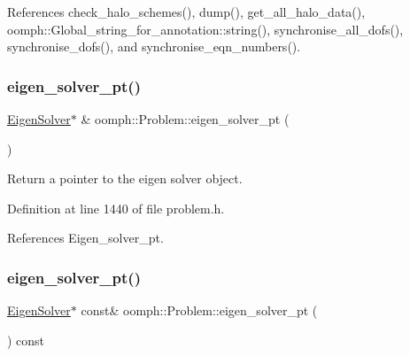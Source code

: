 References check\+\_\+halo\+\_\+schemes(), dump(), get\+\_\+all\+\_\+halo\+\_\+data(), oomph\+::\+Global\+\_\+string\+\_\+for\+\_\+annotation\+::string(), synchronise\+\_\+all\+\_\+dofs(), synchronise\+\_\+dofs(), and synchronise\+\_\+eqn\+\_\+numbers().

\mbox{\label{classoomph_1_1Problem_abd8a7002c37f3a96d0af213bfea8e23c}} 
\subsubsection{\texorpdfstring{eigen\+\_\+solver\+\_\+pt()}{eigen\_solver\_pt()}\hspace{0.1cm}{\footnotesize\ttfamily [1/2]}}
{\footnotesize\ttfamily \hyperlink{classoomph_1_1EigenSolver}{Eigen\+Solver}$\ast$ \& oomph\+::\+Problem\+::eigen\+\_\+solver\+\_\+pt (\begin{DoxyParamCaption}{ }\end{DoxyParamCaption})\hspace{0.3cm}{\ttfamily [inline]}}



Return a pointer to the eigen solver object. 



Definition at line 1440 of file problem.\+h.



References Eigen\+\_\+solver\+\_\+pt.

\mbox{\label{classoomph_1_1Problem_a14d44adcbf581d43154be19d127b6183}} 
\subsubsection{\texorpdfstring{eigen\+\_\+solver\+\_\+pt()}{eigen\_solver\_pt()}\hspace{0.1cm}{\footnotesize\ttfamily [2/2]}}
{\footnotesize\ttfamily \hyperlink{classoomph_1_1EigenSolver}{Eigen\+Solver}$\ast$ const\& oomph\+::\+Problem\+::eigen\+\_\+solver\+\_\+pt (\begin{DoxyParamCaption}{ }\end{DoxyParamCaption}) const\hspace{0.3cm}{\ttfamily [inline]}}



